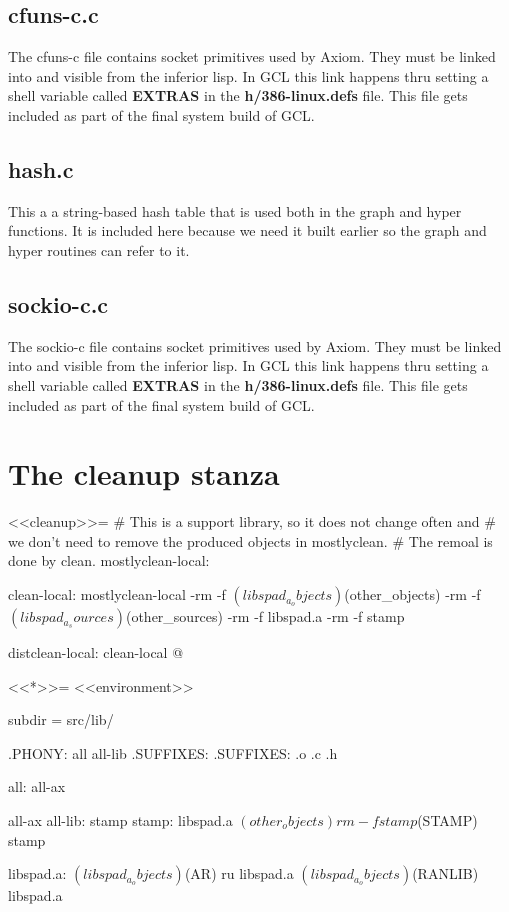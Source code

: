 \documentclass{article}
\begin{document}
\subsection{cfuns-c.c \cite{2}}
The cfuns-c file contains socket primitives used by Axiom.
They must be linked into and visible from the inferior lisp.
In GCL this link happens thru setting a shell variable called
{\bf EXTRAS} in the {\bf h/386-linux.defs} file. This file
gets included as part of the final system build of GCL.

\subsection{hash.c \cite{6}}
This a a string-based hash table that is used both in the graph
and hyper functions. It is included here because we need it built
earlier so the graph and hyper routines can refer to it.

\subsection{sockio-c.c \cite{10}}
The sockio-c file contains socket primitives used by Axiom.
They must be linked into and visible from the inferior lisp.
In GCL this link happens thru setting a shell variable called
{\bf EXTRAS} in the {\bf h/386-linux.defs} file. This file
gets included as part of the final system build of GCL.

\section{The cleanup stanza}
<<cleanup>>=
# This is a support library, so it does not change often and
# we don't need to remove the produced objects in mostlyclean.
# The remoal is done by clean.
mostlyclean-local:

clean-local: mostlyclean-local
	-rm -f $(libspad_a_objects) $(other_objects)
	-rm -f $(libspad_a_sources) $(other_sources)
	-rm -f libspad.a
	-rm -f stamp

distclean-local: clean-local
@

<<*>>=
<<environment>>

subdir = src/lib/

.PHONY: all all-lib
.SUFFIXES:
.SUFFIXES: .o .c .h

all: all-ax

all-ax all-lib: stamp
stamp: libspad.a $(other_objects)
	rm -f stamp
	$(STAMP) stamp

libspad.a: $(libspad_a_objects)
	$(AR) ru libspad.a $(libspad_a_objects)
	$(RANLIB) libspad.a
\end{document}
